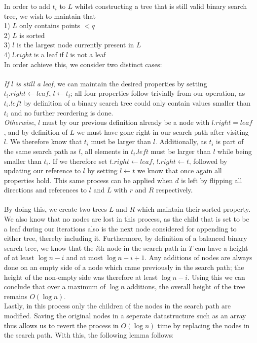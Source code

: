 \documentclass{article}
\begin{document}
In order to add $t_i$ to $L$ whilst constructing a tree that is still valid binary search tree, we wish to maintain that \\
1) $L$ only contains points $< q$ \\
2) $L$ is sorted \\
3) $l$ is the largest node currently present in $L$ \\
4) $l.right$ is a leaf if $l$ is not a leaf \\
In order achieve this, we consider two distinct cases: \\\\
\textit{If $l$ is still a leaf}, we can maintain the desired properties by setting $t_i.right \leftarrow leaf$, $l \leftarrow t_i$; all four properties follow trivially from our operation, as $t_i.left$ by definition of a binary search tree could only contain values smaller than $t_i$ and no further reordering is done. \\
\textit{Otherwise}, $l$ must by our previous definition already be a node with $l.right = leaf$, and by definition of $L$ we must have gone right in our search path after visiting $l$. We therefore know that $t_i$ must be larger than $l$. Additionally, as $t_i$ is part of the same search path as $l$, all elements in $t_i.left$ must be larger than $l$ while being smaller than $t_i$. If we therefore set $t.right \leftarrow leaf$, $l.right \leftarrow t$, followed by updating our reference to $l$ by setting $l \leftarrow t$ we know that once again all properties hold. This same process can be applied when $d$ is left by flipping all directions and references to $l$ and $L$ with $r$ and $R$ respectively. \\\\ 
By doing this, we create two trees $L$ and $R$ which maintain their sorted property. We also know that no nodes are lost in this process, as the child that is set to be a leaf during our iterations also is the next node considered for appending to either tree, thereby including it. Furthermore, by definition of a balanced binary search tree, we know that the $i$th node in the search path in $T$ can have a height of at least $\log n - i$ and at most $\log n - i + 1$. Any additions of nodes are always done on an empty side of a node which came previously in the search path; the height of the non-empty side was therefore at least $\log n - i$. Using this we can conclude that over a maximum of $\log n$ additions, the overall height of the tree remains $O(\log n)$.\\
Lastly, in this process only the children of the nodes in the search path are modified. Saving the original nodes in a seperate datastructure such as an array thus allows us to revert the process in $O(\log n)$ time by replacing the nodes in the search path. With this, the following lemma follows: \\
\end{document}
